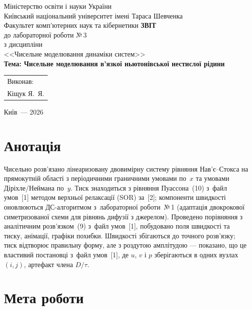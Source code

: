 \documentclass[14pt,a4paper,extarticle]{extarticle}
\newcommand{\lrcond}{файл умов~[1]}
\newcommand{\lrone}{лабораторної роботи~№\,1}
\begin{document}
\begin{titlepage}
  \centering\thispagestyle{empty}
  Міністерство освіти і науки України\\[0.4em]
  Київський національний університет імені Тараса Шевченка\\[0.4em]
  Факультет комп'ютерних наук та кібернетики
  \vfill
  {\Large\bfseries ЗВІТ}\\[0.6em]
  до лабораторної роботи №\,3\\[0.4em]
  з дисципліни\\[0.2em]
  <<Чисельне моделювання динаміки систем>>\\[1.2em]
  {\large\bfseries Тема: Чисельне моделювання в'язкої ньютонівської нестислої рідини}
  \vfill
  \begin{flushright}
    \begin{tabular}{@{}l@{}}
      Виконав:\\
      Кіщук Я.~Я.\\[1.2em]
    \end{tabular}
  \end{flushright}
  \vfill
  Київ~--- 2026
\end{titlepage}

\section*{Анотація}

Чисельно розв'язано лінеаризовану двовимірну систему рівняння Нав'є--Стокса
на прямокутній області з періодичними граничними умовами по~$x$ та умовами
Діріхле/Неймана по~$y$. Тиск знаходиться з рівняння Пуассона~(10) з~\lrcond{}
методом верхньої релаксації (SOR) за~[2]; компоненти швидкості оновлюються
ДС-алгоритмом з~\lrone{} (адаптація двокрокової симетризованої схеми для
рівнянь дифузії з джерелом). Проведено порівняння з аналітичним
розв'язком~(9) з~\lrcond{}, побудовано поля швидкості та тиску, анімації, графіки похибки.
Швидкості збігаються до точного розв'язку; тиск відтворює правильну форму, але
з роздутою амплітудою --- показано, що це властивий постановці з~\lrcond{},
де $u$, $v$ і $p$ зберігаються в одних вузлах $(i,j)$, артефакт
члена $D/\tau$.

\tableofcontents
\newpage

\section{Мета роботи}
\end{document}
